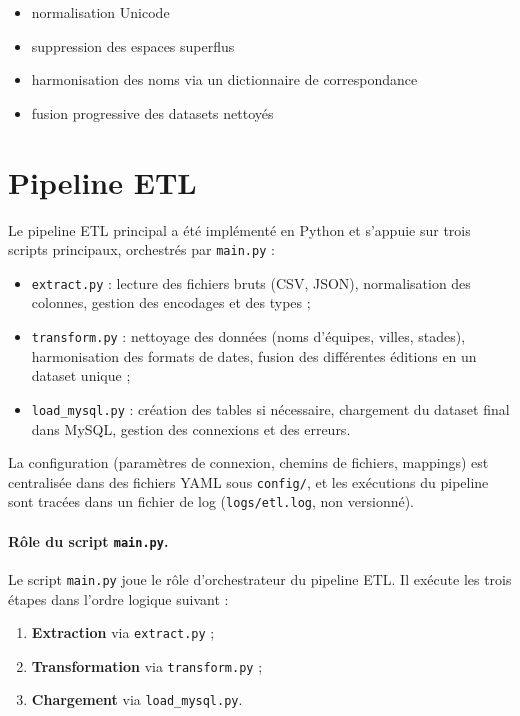 \documentclass[12pt,a4paper]{article}
\begin{document}
\begin{itemize}
    \item normalisation Unicode
    \item suppression des espaces superflus
    \item harmonisation des noms via un dictionnaire de correspondance
    \item fusion progressive des datasets nettoyés
\end{itemize}

\newpage
\section{Pipeline ETL}

Le pipeline ETL principal a été implémenté en Python et s’appuie sur trois scripts principaux, orchestrés par \texttt{main.py} :

\begin{itemize}
    \item \texttt{extract.py} : lecture des fichiers bruts (CSV, JSON), normalisation des colonnes, gestion des encodages et des types ;
    \item \texttt{transform.py} : nettoyage des données (noms d’équipes, villes, stades), harmonisation des formats de dates, fusion des différentes éditions en un dataset unique ;
    \item \texttt{load\_mysql.py} : création des tables si nécessaire, chargement du dataset final dans MySQL, gestion des connexions et des erreurs.
\end{itemize}

La configuration (paramètres de connexion, chemins de fichiers, mappings) est centralisée dans des fichiers YAML sous \texttt{config/}, et les exécutions du pipeline sont tracées dans un fichier de log (\texttt{logs/etl.log}, non versionné).

\paragraph{Rôle du script \texttt{main.py}.}

Le script \texttt{main.py} joue le rôle d’orchestrateur du pipeline ETL.  
Il exécute les trois étapes dans l’ordre logique suivant :

\begin{enumerate}
    \item \textbf{Extraction} via \texttt{extract.py} ;
    \item \textbf{Transformation} via \texttt{transform.py} ;
    \item \textbf{Chargement} via \texttt{load\_mysql.py}.
\end{enumerate}
\end{document}
